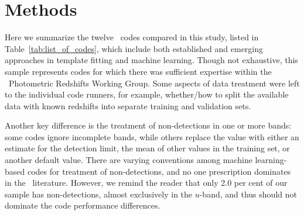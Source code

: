 \section{Methods}
\label{sec:pzcodes}

Here we summarize the twelve \pzpdf\ codes compared in this study, listed in Table~\ref{tab:list_of_codes}, which include both established and emerging approaches in template fitting and machine learning.
Though not exhaustive, this sample represents codes for which there was sufficient expertise within the \lsstdesc\ Photometric Redshifts Working Group.
Some aspects of data treatment were left to the individual code runners, for example, whether/how to split the available data with known redshifts into separate training and validation sets.

Another key difference is the treatment of non-detections in one or more bands: some codes ignore incomplete bands, while others replace the value with either an estimate for the detection limit, the mean of other values in the training set, or another default value.
There are varying conventions among machine learning-based codes for treatment of non-detections, and no one prescription dominates in the \pz\ literature.
However, we remind the reader that only 2.0 per cent of our sample has non-detections, almost exclusively in the $u$-band, and thus should not dominate the code performance differences.


